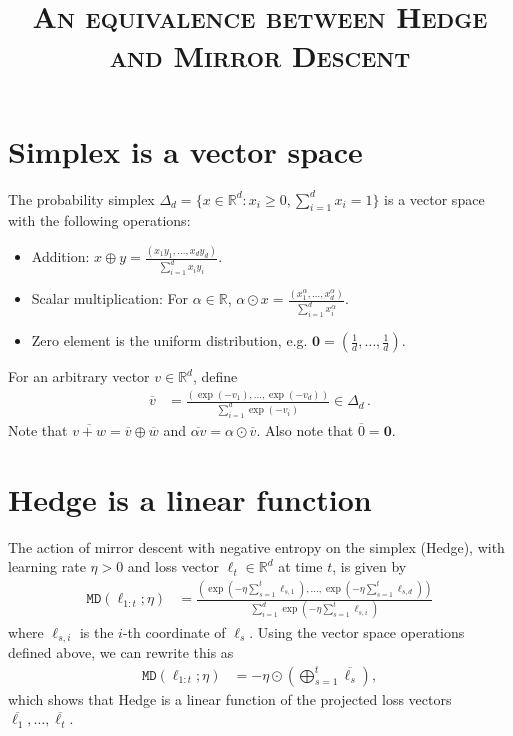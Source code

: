 \documentclass{article}
\title{\textsc{An equivalence between Hedge and Mirror Descent}}
\theoremstyle{plain}
\theoremstyle{definition}
\newtheorem{remark}[theorem]{Remark}
\newcommand{\R}{\mathbb R}
\newcommand{\fmd}{\texttt{MD}}
\begin{document}
\maketitle

\section{Simplex is a vector space}
The probability simplex $\Delta_d = \{x \in \R^d: x_i \geq 0, \sum_{i=1}^d x_i = 1\}$ is a vector space with the following operations:
\begin{itemize}
    \item Addition: $x \oplus y = \frac{(x_1y_1, \ldots, x_dy_d)}{\sum_{i=1}^{d} x_iy_i}$.
    \item Scalar multiplication: For $\alpha \in \R$, $\alpha \odot x = \frac{(x_1^\alpha, \ldots, x_d^\alpha)}{\sum_{i=1}^{d} x_i^\alpha}$.
    \item Zero element is the uniform distribution, e.g. $\textbf{0} = (\frac{1}{d}, \ldots, \frac{1}{d})$.
\end{itemize}
For an arbitrary vector $v \in \R^d$, define
\begin{align*}
    \overline{v} & = \frac{(\exp(-v_1), \ldots, \exp(-v_d))}{\sum_{i=1}^{d} \exp(-v_i)} \in \Delta_d\,.
\end{align*}
Note that $\overline{v+w} = \overline{v} \oplus \overline{w}$ and $\overline{\alpha v} = \alpha \odot \overline{v}$. Also note that $\overline{0} = \textbf{0}$.

\section{Hedge is a linear function}
The action of mirror descent with negative entropy on the simplex (Hedge),
with learning rate $\eta > 0$ and loss vector $\ell_t \in \R^d$ at time $t$, is given by
\begin{align*}
    \fmd(\ell_{1:t}; \eta) & = \frac{
        \left(
        \exp(-\eta \sum_{s=1}^t \ell_{s,1}), \ldots, \exp(-\eta \sum_{s=1}^t \ell_{s,d})
        \right)
    }{\sum_{i=1}^{d} \exp(-\eta \sum_{s=1}^t \ell_{s,i})}
\end{align*}
where $\ell_{s,i}$ is the $i$-th coordinate of $\ell_s$.
Using the vector space operations defined above, we can rewrite this as
\begin{align*}
    \fmd(\ell_{1:t}; \eta) & = -\eta \odot \left( \bigoplus_{s=1}^t \overline{\ell_s} \right),
\end{align*}
which shows that Hedge is a linear function of the projected loss vectors $\overline{\ell_1}, \ldots, \overline{\ell_t}$.
\end{document}
